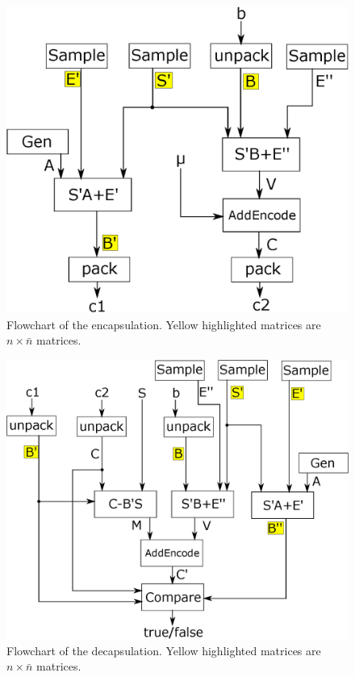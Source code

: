 \begin{figure}[tbhp]
\centering

\includegraphics[scale=0.6]{figures/frodo_flowchart_encaps}

\caption{Flowchart of the encapsulation. Yellow highlighted matrices are $n \times \bar{n}$ matrices.}
\label{fig:flowchart_encaps}
\end{figure}

\begin{figure}[tbhp]
\centering

\includegraphics[scale=0.6]{figures/frodo_flowchart_decaps}

\caption{Flowchart of the decapsulation. Yellow highlighted matrices are $n \times \bar{n}$ matrices.}
\label{fig:flowchart_decaps}
\end{figure}

